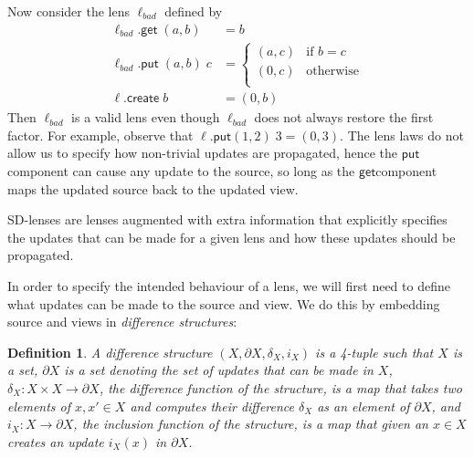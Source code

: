 \documentclass[acmsmall,review,anonymous]{acmart}\settopmatter{printfolios=true,printccs=false,printacmref=false}
\newtheorem{definition}{Definition}
\newcommand{\kw}[1]{\ensuremath{\mathsf{#1}}}
\newcommand{\get}{\ensuremath{\kw{get}}}
\newcommand{\pput}{\ensuremath{\kw{put}}}
\newcommand{\create}{\ensuremath{\kw{create}}}
\begin{document}
Now consider the lens $\ell_{bad}$ defined by
\begin{align*}
\ell_{bad}.\get \; (a, b) &= b\\
\ell_{bad}.\pput \; (a, b) \; c &= \begin{cases}
(a, c) & \text{if }b = c\\
(0, c) & \text{otherwise}\\
\end{cases}\\
\ell.\create \; b &= (0,b)
\end{align*}
Then $\ell_{bad}$ is a valid lens even though $\ell_{bad}$ does not
always restore the first factor. For example, observe that $\ell.\pput (1, 2) \;
3 = (0,3)$. The lens laws do not allow us to specify how non-trivial updates are
propagated, hence the \pput component can cause any update to the source, so
long as the \get component maps the updated source back to the updated view.

SD-lenses are lenses augmented with extra information that explicitly specifies
the updates that can be made for a given lens and how these updates should be
propagated.

In order to specify the intended behaviour of a lens, we will first need to
define what updates can be made to the source and view. We do this by embedding
source and views in {\em difference structures}:
\begin{definition}
A difference structure $(X, \partial X, \delta_X, i_X)$ is a 4-tuple such that
$X$ is a set, $\partial X$ is a set denoting the set of updates that can be
made in $X$, $\delta_X : X \times X \longrightarrow \partial X$, the {\em
difference function} of the structure, is a map that takes two elements of $x,
x' \in X$ and computes their difference $\delta_X$ as an element of $\partial
X$, and $i_X : X \longrightarrow \partial X$, the {\em inclusion function} of
the structure, is a map that given an $x \in X$ creates an update $i_X(x)$ in
$\partial X$.
\end{definition}
\end{document}

